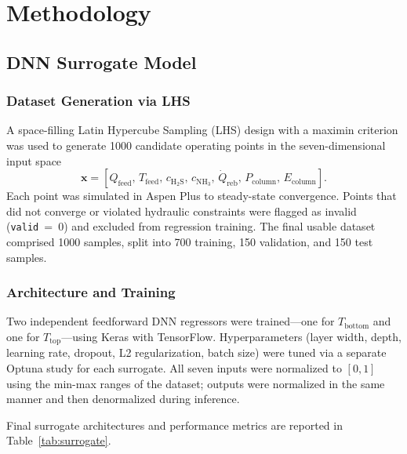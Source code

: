 \documentclass[journal,10pt,twocolumn]{IEEEtran}
\begin{document}
\section{Methodology}
\label{sec:method}

\subsection{DNN Surrogate Model}
\label{ssec:surrogate}

\subsubsection{Dataset Generation via LHS}
A space-filling Latin Hypercube Sampling (LHS) design with a maximin criterion was used to generate 1000 candidate operating points in the seven-dimensional input space
\[
  \mathbf{x} = [Q_\text{feed},\, T_\text{feed},\, c_\mathrm{H_2S},\, c_\mathrm{NH_3},\, \dot{Q}_\text{reb},\, P_\text{column},\, E_\text{column}].
\]
Each point was simulated in Aspen Plus to steady-state convergence. Points that did not converge or violated hydraulic constraints were flagged as invalid (\texttt{valid}~=~0) and excluded from regression training. The final usable dataset comprised 1000 samples, split into 700 training, 150 validation, and 150 test samples.

\subsubsection{Architecture and Training}
Two independent feedforward DNN regressors were trained---one for $T_\text{bottom}$ and one for $T_\text{top}$---using Keras with TensorFlow. Hyperparameters (layer width, depth, learning rate, dropout, L2 regularization, batch size) were tuned via a separate Optuna study for each surrogate. All seven inputs were normalized to $[0, 1]$ using the min-max ranges of the dataset; outputs were normalized in the same manner and then denormalized during inference.

Final surrogate architectures and performance metrics are reported in Table~\ref{tab:surrogate}.
\end{document}
